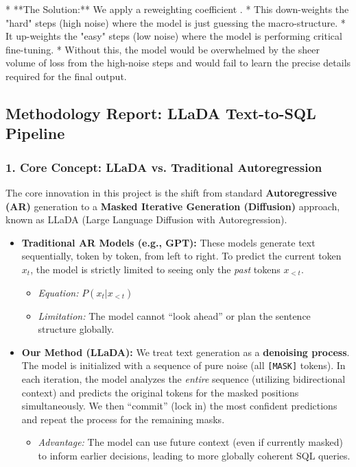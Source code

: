 \documentclass[a4paper,12pt]{article}
\begin{document}
* **The Solution:** We apply a reweighting coefficient .
* This down-weights the "hard" steps (high noise) where the model is just guessing the macro-structure.
* It up-weights the "easy" steps (low noise) where the model is performing critical fine-tuning.
* Without this, the model would be overwhelmed by the sheer volume of loss from the high-noise steps and would fail to learn the precise details required for the final output.

\subsection{Methodology Report: LLaDA Text-to-SQL Pipeline}

\subsubsection{1. Core Concept: LLaDA vs. Traditional Autoregression}

The core innovation in this project is the shift from standard \textbf{Autoregressive (AR)} generation to a \textbf{Masked Iterative Generation (Diffusion)} approach, known as LLaDA (Large Language Diffusion with Autoregression).

\begin{itemize}
    \item \textbf{Traditional AR Models (e.g., GPT):} These models generate text sequentially, token by token, from left to right. To predict the current token $x_t$, the model is strictly limited to seeing only the \textit{past} tokens $x_{<t}$.
    \begin{itemize}
        \item \textit{Equation:} $P(x_t | x_{<t})$
        \item \textit{Limitation:} The model cannot ``look ahead'' or plan the sentence structure globally.
    \end{itemize}
    
    \item \textbf{Our Method (LLaDA):} We treat text generation as a \textbf{denoising process}. The model is initialized with a sequence of pure noise (all \texttt{[MASK]} tokens). In each iteration, the model analyzes the \textit{entire} sequence (utilizing bidirectional context) and predicts the original tokens for the masked positions simultaneously. We then ``commit'' (lock in) the most confident predictions and repeat the process for the remaining masks.
    \begin{itemize}
        \item \textit{Advantage:} The model can use future context (even if currently masked) to inform earlier decisions, leading to more globally coherent SQL queries.
    \end{itemize}
\end{itemize}
\end{document}
